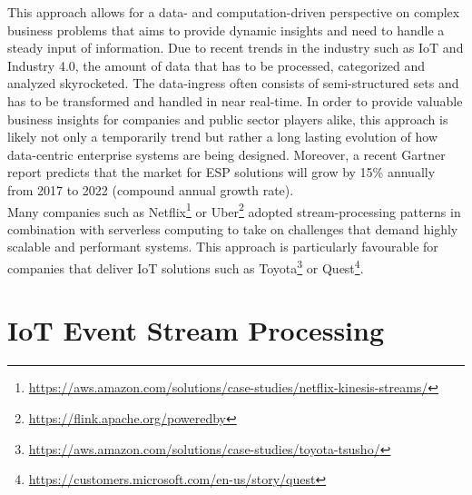 \begin{enumerate}
    This approach allows for a data- and computation-driven perspective on complex business problems that aims to provide dynamic insights and need to handle a steady input of information. 
    Due to recent trends in the industry such as IoT and Industry 4.0, the amount of data that has to be processed, categorized and analyzed skyrocketed. The data-ingress often consists of semi-structured sets and has to be transformed and handled in near real-time.\autocite{Dekate2017PredictsInfrastructure} In order to provide valuable business insights for companies and public sector players alike, this approach is likely not only a temporarily trend but rather a long lasting evolution of how data-centric enterprise systems are being designed. Moreover, a recent Gartner report predicts that the market for \acf{ESP} solutions will grow by 15\% annually from 2017 to 2022 (compound annual growth rate).\autocite{Heudecker2017MarketProcessing} \\
    Many companies such as Netflix\footnote{\url{https://aws.amazon.com/solutions/case-studies/netflix-kinesis-streams/}} or Uber\footnote{\url{https://flink.apache.org/poweredby}} adopted stream-processing patterns in combination with serverless computing to take on challenges that demand highly scalable and performant systems. 
    This approach is particularly favourable for companies that deliver IoT solutions such as Toyota\footnote{\url{https://aws.amazon.com/solutions/case-studies/toyota-tsusho/}} or Quest\footnote{\url{https://customers.microsoft.com/en-us/story/quest}}.
    
\end{enumerate}


\section{IoT Event Stream Processing}

